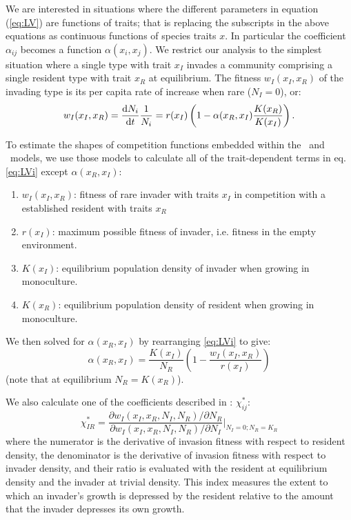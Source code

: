 \documentclass[a4paper,11pt]{article}
\begin{document}
We are interested in situations where the different parameters in equation (\ref{eq:LV}) are functions of traits; that is replacing the subscripts in the above equations as continuous functions of species traits $x$.
In particular the coefficient $\alpha_{ij}$ becomes a function $\alpha(x_i, x_j)$.
%
We restrict our analysis to the simplest situation where a single type with trait $x_I$ invades a community comprising a single resident type with trait $x_R$ at equilibrium.
The fitness $w_I(x_I,
x_R)$ of the invading type is its per capita rate of increase when rare ($N_I = 0$), or:
%
\begin{equation}
  \label{eq:LVi}
   w_I(x_I, x_R) = \frac{\mathrm{d} N_i}{\mathrm{d} t} \frac{1}{N_i} =
    r(x_I)\left(1 - \alpha(x_R, x_I) \frac{K(x_R)}{K(x_I)}\right).
\end{equation}

To estimate the shapes of competition functions embedded within the
\Rstar\ and \plant\ models, we use those models to calculate all of the trait-dependent terms in eq. \ref{eq:LVi} except $\alpha(x_R,
x_I)$:
\begin{enumerate}
\item $w_I(x_I, x_R)$: fitness of rare invader with traits $x_I$  in
  competition with a established resident with traits $x_R$
\item $r(x_I)$: maximum possible fitness of invader, i.e. fitness in
  the empty environment.
\item $K(x_I)$: equilibrium population density of invader when growing
  in monoculture.
\item $K(x_R)$: equilibrium population density of resident when
  growing in monoculture.
\end{enumerate}
We then solved for $\alpha(x_R, x_I)$ by rearranging  \ref{eq:LVi} to give:
\begin{equation}
  \label{eq:alpha}
  \alpha(x_R, x_I) = \frac{K(x_I)}{N_R}
  \left(1 - \frac{w_I(x_I, x_R)}{r(x_I)}\right)
\end{equation}
(note that at equilibrium $N_R = K(x_R)$).


We also calculate one of the coefficients described in
\citet{Abrams-2008}: $\chi_{ij}^{*}$:
%
\begin{equation}
  \label{eq:abrams-coef}
  \chi_{IR}^{*} =
  \frac{\partial w_I(x_I, x_R, N_I, N_R) /  \partial N_R}%
  {\partial w_I(x_I, x_R, N_I, N_R) / \partial N_I}
  \bigg|_{N_I=0; N_R=K_{R}}
\end{equation}
%
where the numerator is the derivative of invasion fitness with respect to resident density, the denominator is the derivative of invasion fitness with respect to invader density, and their ratio is evaluated with the resident at equilibrium density and the invader at trivial density.
This index measures the extent to which an invader's growth is depressed by the resident relative to the amount that the invader depresses its own growth.
\end{document}
